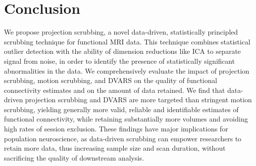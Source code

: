 \documentclass{article}
\begin{document}






\section{Conclusion}

We propose projection scrubbing, a novel data-driven, statistically principled scrubbing technique for functional MRI data. This technique combines statistical outlier detection with the ability of dimension reductions like ICA to separate signal from noise, in order to identify the presence of statistically significant abnormalities in the data. We comprehensively evaluate the impact of projection scrubbing, motion scrubbing, and DVARS on the quality of functional connectivity estimates and on the amount of data retained. We find that data-driven projection scrubbing and DVARS are more targeted than stringent motion scrubbing, yielding generally more valid, reliable and identifiable estimates of functional connectivity, while retaining substantially more volumes and avoiding high rates of session exclusion. These findings have major implications for population neuroscience, as data-driven scrubbing can empower researchers to retain more data, thus increasing sample size and scan duration, without sacrificing the quality of downstream analysis.  %
\end{document}
